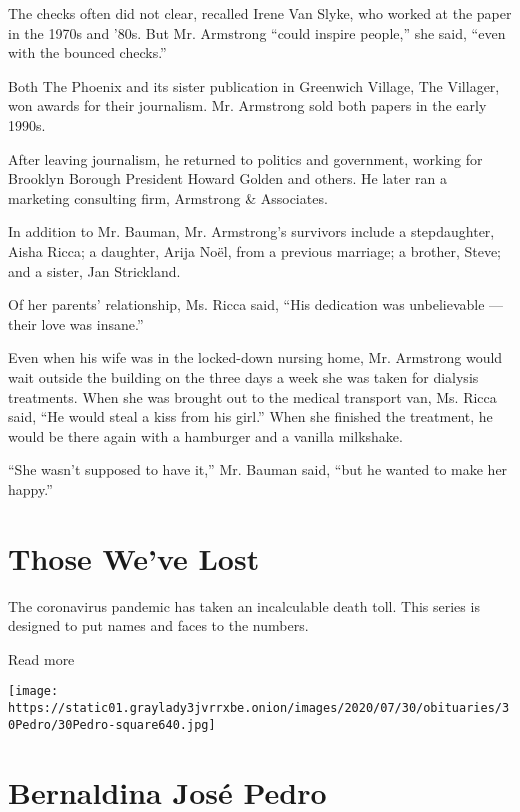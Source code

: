 The checks often did not clear, recalled Irene Van Slyke, who worked at
the paper in the 1970s and '80s. But Mr. Armstrong ``could inspire
people,'' she said, ``even with the bounced checks.''

Both The Phoenix and its sister publication in Greenwich Village, The
Villager, won awards for their journalism. Mr. Armstrong sold both
papers in the early 1990s.

After leaving journalism, he returned to politics and government,
working for Brooklyn Borough President Howard Golden and others. He
later ran a marketing consulting firm, Armstrong \& Associates.

In addition to Mr. Bauman, Mr. Armstrong's survivors include a
stepdaughter, Aisha Ricca; a daughter, Arija Noël, from a previous
marriage; a brother, Steve; and a sister, Jan Strickland.

Of her parents' relationship, Ms. Ricca said, ``His dedication was
unbelievable --- their love was insane.''

Even when his wife was in the locked-down nursing home, Mr. Armstrong
would wait outside the building on the three days a week she was taken
for dialysis treatments. When she was brought out to the medical
transport van, Ms. Ricca said, ``He would steal a kiss from his girl.''
When she finished the treatment, he would be there again with a
hamburger and a vanilla milkshake.

``She wasn't supposed to have it,'' Mr. Bauman said, ``but he wanted to
make her happy.''

\href{https://www.nytimes3xbfgragh.onion/interactive/2020/obituaries/people-died-coronavirus-obituaries.html?action=click\&pgtype=Article\&state=default\&region=BELOW_MAIN_CONTENT\&context=covid_obits_promo}{}

\hypertarget{those-weve-lost}{%
\section{Those We've Lost}\label{those-weve-lost}}

The coronavirus pandemic has taken an incalculable death toll. This
series is designed to put names and faces to the numbers.

Read more

\texttt{[image: https://static01.graylady3jvrrxbe.onion/images/2020/07/30/obituaries/30Pedro/30Pedro-square640.jpg]}

\hypertarget{bernaldina-josuxe9-pedro}{%
\section{Bernaldina José Pedro}\label{bernaldina-josuxe9-pedro}}

